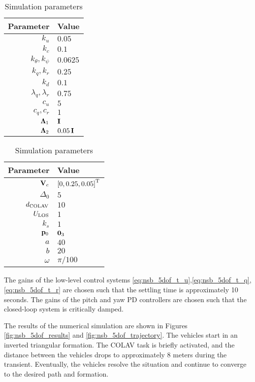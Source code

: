 \begin{table}[b]
    \centering
    \begin{tabular}[t]{r|l}
        {\bf Parameter} & {\bf Value} \\ \hline
        $k_u$ & $0.05$ \\
        $k_c$ & $0.1$ \\
        $k_{\theta}, k_{\psi}$ & $0.0625$ \\
        $k_q, k_r$ & $0.25$ \\
        $k_d$ & $0.1$ \\
        $\lambda_q, \lambda_r$ & $0.75$ \\
        $c_u$ & $5$ \\
        $c_q, c_r$ & $1$ \\
        $\bm{\Lambda}_1$ & $\mathbf{I}$ \\
        $\bm{\Lambda}_2$ & $0.05\,\mathbf{I}$
    \end{tabular}
    \begin{tabular}[t]{r|l}
        {\bf Parameter} & {\bf Value} \\ \hline
        $\mathbf{V}_c$ & $\left[0, 0.25, 0.05\right]^{\mathrm{T}}$ \\
        $\Delta_0$ & $5$ \\
        $d_{\rm COLAV}$ & $10$ \\
        $U_{\rm LOS}$ & $1$ \\
        $k_{s}$ & $1$ \\
        $\mathbf{p}_0$ & $\mathbf{0}_3$ \\
        $a$ & $40$ \\
        $b$ & $20$ \\
        $\omega$ & $\pi / 100$
    \end{tabular}
    \caption{Simulation parameters}
    \label{tab:nsb_5dof_params}
\end{table}

The gains of the low-level control systems \eqref{eq:nsb_5dof_t_u},\eqref{eq:nsb_5dof_t_q},\eqref{eq:nsb_5dof_t_r} are chosen such that the settling time is approximately 10 seconds.
The gains of the pitch and yaw PD controllers are chosen such that the closed-loop system is critically damped.

The results of the numerical simulation are shown in Figures \ref{fig:nsb_5dof_results} and \ref{fig:nsb_5dof_trajectory}.
The vehicles start in an inverted triangular formation.
The COLAV task is briefly activated, and the distance between the vehicles drops to approximately 8 meters during the transient.
Eventually, the vehicles resolve the situation and continue to converge to the desired path and formation.

